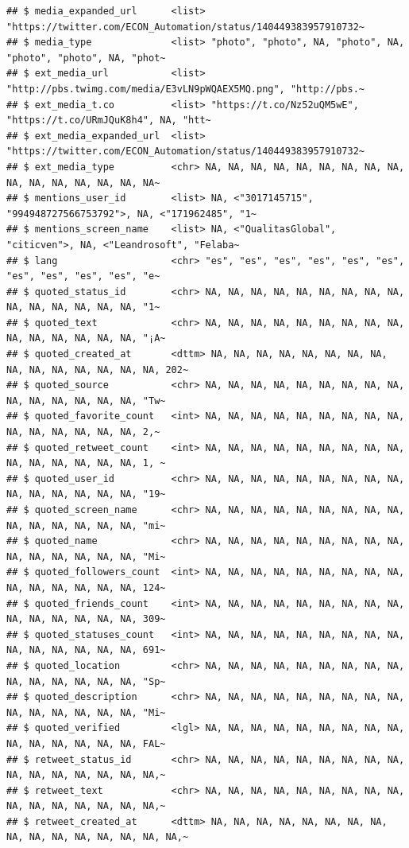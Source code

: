\documentclass[
]{book}
\begin{document}
\begin{verbatim}
## $ media_expanded_url      <list> "https://twitter.com/ECON_Automation/status/140449383957910732~
## $ media_type              <list> "photo", "photo", NA, "photo", NA, "photo", "photo", NA, "phot~
## $ ext_media_url           <list> "http://pbs.twimg.com/media/E3vLN9pWQAEX5MQ.png", "http://pbs.~
## $ ext_media_t.co          <list> "https://t.co/Nz52uQM5wE", "https://t.co/URmJQuK8h4", NA, "htt~
## $ ext_media_expanded_url  <list> "https://twitter.com/ECON_Automation/status/140449383957910732~
## $ ext_media_type          <chr> NA, NA, NA, NA, NA, NA, NA, NA, NA, NA, NA, NA, NA, NA, NA, NA~
## $ mentions_user_id        <list> NA, <"3017145715", "994948727566753792">, NA, <"171962485", "1~
## $ mentions_screen_name    <list> NA, <"QualitasGlobal", "citicven">, NA, <"Leandrosoft", "Felaba~
## $ lang                    <chr> "es", "es", "es", "es", "es", "es", "es", "es", "es", "es", "e~
## $ quoted_status_id        <chr> NA, NA, NA, NA, NA, NA, NA, NA, NA, NA, NA, NA, NA, NA, NA, "1~
## $ quoted_text             <chr> NA, NA, NA, NA, NA, NA, NA, NA, NA, NA, NA, NA, NA, NA, NA, "¡A~
## $ quoted_created_at       <dttm> NA, NA, NA, NA, NA, NA, NA, NA, NA, NA, NA, NA, NA, NA, NA, 202~
## $ quoted_source           <chr> NA, NA, NA, NA, NA, NA, NA, NA, NA, NA, NA, NA, NA, NA, NA, "Tw~
## $ quoted_favorite_count   <int> NA, NA, NA, NA, NA, NA, NA, NA, NA, NA, NA, NA, NA, NA, NA, 2,~
## $ quoted_retweet_count    <int> NA, NA, NA, NA, NA, NA, NA, NA, NA, NA, NA, NA, NA, NA, NA, 1, ~
## $ quoted_user_id          <chr> NA, NA, NA, NA, NA, NA, NA, NA, NA, NA, NA, NA, NA, NA, NA, "19~
## $ quoted_screen_name      <chr> NA, NA, NA, NA, NA, NA, NA, NA, NA, NA, NA, NA, NA, NA, NA, "mi~
## $ quoted_name             <chr> NA, NA, NA, NA, NA, NA, NA, NA, NA, NA, NA, NA, NA, NA, NA, "Mi~
## $ quoted_followers_count  <int> NA, NA, NA, NA, NA, NA, NA, NA, NA, NA, NA, NA, NA, NA, NA, 124~
## $ quoted_friends_count    <int> NA, NA, NA, NA, NA, NA, NA, NA, NA, NA, NA, NA, NA, NA, NA, 309~
## $ quoted_statuses_count   <int> NA, NA, NA, NA, NA, NA, NA, NA, NA, NA, NA, NA, NA, NA, NA, 691~
## $ quoted_location         <chr> NA, NA, NA, NA, NA, NA, NA, NA, NA, NA, NA, NA, NA, NA, NA, "Sp~
## $ quoted_description      <chr> NA, NA, NA, NA, NA, NA, NA, NA, NA, NA, NA, NA, NA, NA, NA, "Mi~
## $ quoted_verified         <lgl> NA, NA, NA, NA, NA, NA, NA, NA, NA, NA, NA, NA, NA, NA, NA, FAL~
## $ retweet_status_id       <chr> NA, NA, NA, NA, NA, NA, NA, NA, NA, NA, NA, NA, NA, NA, NA, NA,~
## $ retweet_text            <chr> NA, NA, NA, NA, NA, NA, NA, NA, NA, NA, NA, NA, NA, NA, NA, NA,~
## $ retweet_created_at      <dttm> NA, NA, NA, NA, NA, NA, NA, NA, NA, NA, NA, NA, NA, NA, NA, NA,~

\end{verbatim}
\end{document}
